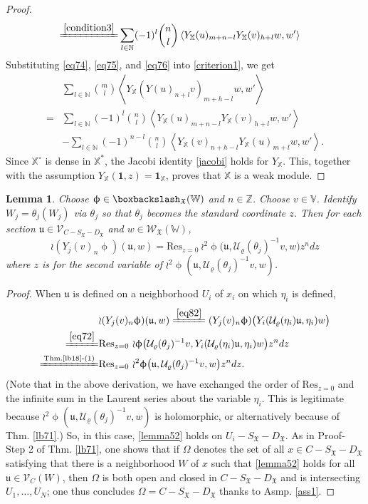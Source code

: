 \documentclass[11pt,b5paper,notitlepage]{article}
\theoremstyle{definition}
\theoremstyle{plain}
\newtheorem{lm}[df]{Lemma}
\newcommand{\fk}{\mathfrak}
\newcommand{\mc}{\mathcal}
\newcommand{\Res}{\mathrm{Res}}
\newcommand{\scr}{\mathscr}
\newcommand{\SX}{{S_{\fk X}}}
\newcommand{\DX}{D_{\fk X}}
\newcommand{\Vbb}{\mathbb V}
\newcommand{\Xbb}{\mathbb X}
\newcommand{\Wbb}{\mathbb W}
\newcommand{\Nbb}{\mathbb N}
\newcommand{\Zbb}{\mathbb Z}
\newcommand{\ibf}{\mathbf 1}
\newcommand{\<}{\left\langle}
\renewcommand{\>}{\right\rangle}
\newcommand{\fx}{\mathfrak{X}}
\numberwithin{equation}{subsection}
\begin{document}
\begin{proof}
\begin{align}
\xlongequal{\eqref{condition3}}&\sum_{l\in \Nbb}(-1)^l \binom{n}{l}\<Y_\Xbb(u)_{m+n-l}Y_\Xbb(v)_{h+l}w,w'\>  \label{eq76}
\end{align}
Substituting \eqref{eq74}, \eqref{eq75}, and \eqref{eq76} into \eqref{criterion1}, we get
\begin{align*}
&\sum_{l\in \Nbb}\binom{m}{l}\<Y_\Xbb(Y(u)_{n+l}v)_{m+h-l}w,w'\>\\
        =&\sum_{l\in \Nbb}(-1)^l \binom{n}{l}\<Y_\Xbb(u)_{m+n-l}Y_\Xbb(v)_{h+l}w,w'\>\\
&-\sum_{l\in \Nbb}(-1)^{n-l}\binom{n}{l}\<Y_\Xbb(v)_{n+h-l}Y_\Xbb(u)_{m+l}w,w'\>.
\end{align*}
Since $\Xbb^\circ$ is dense in $\Xbb^*$, the Jacobi identity \eqref{jacobi} holds for $Y_\Xbb$.    This, together with the assumption $Y_\Xbb(\ibf,z)=\ibf_\Xbb$, proves that $\Xbb$ is a weak module.
\end{proof}



\begin{lm}\label{lb23}
Choose $\upphi\in \boxbackslash_{\fx}(\Wbb)$ and $n\in \Zbb$. Choose $v\in\Vbb$. Identify $W_j=\theta_j(W_j)$ via $\theta_j$ so that $\theta_j$ becomes the standard coordinate $z$. Then for each section $\fk u\in\scr V_{C-\SX-\DX}$ and $w\in\scr W_{\fk X}(\Wbb)$,
    \begin{equation}\label{lemma52}
    \wr(Y_j(v)_n\upphi)(\fk u,w)=\Res_{z=0}~{\wr^2\upphi}\big(\fk u,\mc U_\varrho(\theta_j)^{-1}v,w\big)z^n dz
    \end{equation}
where $z$ is for the second variable of ${\wr^2\upphi}(\fk u,\mc U_\varrho(\theta_j)^{-1}v,w)$.
\end{lm}
\begin{proof}
When $\fk u$ is defined on a neighborhood $U_i$ of $x_i$ on which $\eta_i$ is defined, 
\begin{align*}
 & {\wr(Y_j(v)_n\upphi)}(\fk u,w)\xlongequal{\eqref{eq82}}(Y_j(v)_n\upphi)\big(Y_i(\mc U_\varrho(\eta_i)\fk u,\eta_i)w\big)\\
\xlongequal{\eqref{eq72}}&\Res_{z=0}~{\wr\upphi}\big(\mc U_\varrho(\theta_j)^{-1}v,Y_i(\mc U_\varrho(\eta_i)\fk u,\eta_i)w\big)z^n dz\\
\xlongequal{\text{Thm.\ref{lb18}-(1)}}&\Res_{z=0}~{\wr^2 \upphi}\big(\fk u,\mc U_\varrho(\theta_j)^{-1}v,w\big)z^n dz.
\end{align*}
(Note that in the above derivation, we have exchanged the order of $\Res_{z=0}$ and the infinite sum in the Laurent series about the variable $\eta_i$. This is legitimate because ${\wr^2 \upphi}(\fk u,\mc U_\varrho(\theta_j)^{-1}v,w)$ is holomorphic, or alternatively because of Thm. \ref{lb71}.)    So, in this case, \eqref{lemma52} holds on $U_i-\SX-\DX$. As in Proof-Step 2 of Thm. \ref{lb71}, one shows that if $\Omega$ denotes the set of all $x\in C-\SX-\DX$ satisfying that there is a neighborhood $W$ of $x$ such that \eqref{lemma52} holds for all $\fk u\in\scr V_C(W)$, then $\Omega$ is both open and closed in $C-\SX-\DX$ and is intersecting $U_1,\dots,U_N$; one thus concludes $\Omega=C-\SX-\DX$ thanks to Asmp. \ref{ass1}.
\end{proof}
\end{document}
